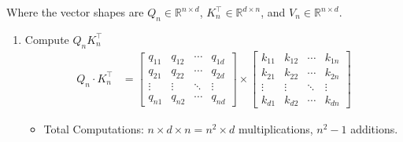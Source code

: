 \documentclass[times, review, 10pt]{elsarticle}
\begin{document}
Where the vector shapes are \(Q_n \in \mathbb{R}^{n\times d}\), \(K_n^{\top} \in \mathbb{R}^{d\times n}\), and \(V_n \in \mathbb{R}^{n\times d}\).


\begin{enumerate}
    \item[1.] Compute \(Q_n K_n^{\top}\)
    \begin{align}
        Q_n \cdot K_n^{\top} &=  %
        \begin{bmatrix}
        q_{11} & q_{12} & \cdots & q_{1d} \\
        q_{21} & q_{22} & \cdots & q_{2d} \\
        \vdots & \vdots & \ddots & \vdots \\
        q_{n1} & q_{n2} & \cdots & q_{nd}
        \end{bmatrix} 
        \times
        \begin{bmatrix}
        k_{11} & k_{12} & \cdots & k_{1n} \\
        k_{21} & k_{22} & \cdots & k_{2n} \\
        \vdots & \vdots & \ddots & \vdots \\
        k_{d1} & k_{d2} & \cdots & k_{dn}
        \end{bmatrix}
        \label{eq:app-asym-vanilla-qk}
    \end{align}
    \begin{itemize}
        \item Total Computations: \(n \times d \times n = n^2 \times d\) multiplications, \(n^2 - 1\) additions.
    \end{itemize}


\end{enumerate}
\end{document}
